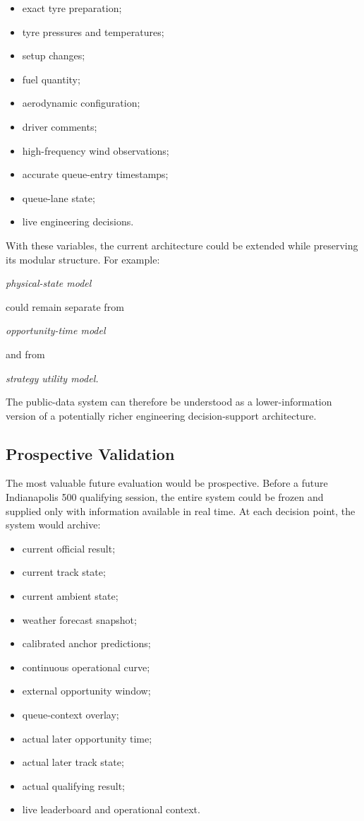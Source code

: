 \begin{itemize}
\item exact tyre preparation;
\item tyre pressures and temperatures;
\item setup changes;
\item fuel quantity;
\item aerodynamic configuration;
\item driver comments;
\item high-frequency wind observations;
\item accurate queue-entry timestamps;
\item queue-lane state;
\item live engineering decisions.
\end{itemize}

With these variables, the current architecture could be extended while preserving its modular structure. For example:

\begin{center}\textit{physical-state model}\end{center}

could remain separate from

\begin{center}\textit{opportunity-time model}\end{center}

and from

\begin{center}\textit{strategy utility model.}\end{center}

The public-data system can therefore be understood as a lower-information version of a potentially richer engineering decision-support architecture.

\subsection{Prospective Validation}
The most valuable future evaluation would be prospective. Before a future Indianapolis 500 qualifying session, the entire system could be frozen and supplied only with information available in real time. At each decision point, the system would archive:

\begin{itemize}
\item current official result;
\item current track state;
\item current ambient state;
\item weather forecast snapshot;
\item calibrated anchor predictions;
\item continuous operational curve;
\item external opportunity window;
\item queue-context overlay;
\item actual later opportunity time;
\item actual later track state;
\item actual qualifying result;
\item live leaderboard and operational context.
\end{itemize}

